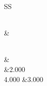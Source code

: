 \begin{longtable}{SS}
\caption{The first table}\\\toprule{}	&	\\\midrule\endfirsthead\caption{The first table (continued)}\\\toprule{}	&	\\\midrule{}	&2.000	\\
4.000	&3.000
\\\bottomrule
\end{longtable}
